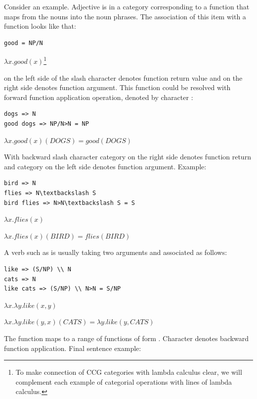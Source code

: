 Consider an example. Adjective  is in a category corresponding to a function that maps from the nouns into the noun phrases. The association of this item with a function looks like that:

\begin{verbatim}
good = NP/N 
\end{verbatim}

$\lambda x.good(x)$\footnote{To make connection of CCG categories with lambda calculus clear, we will complement each example of categorial operations with lines of lambda calculus.}

 on the left side of the slash character denotes function return value and  on the right side denotes function argument. This function could be resolved with forward function application operation, denoted by character \code{>}:

\begin{verbatim}
dogs => N
good dogs => NP/N>N = NP
\end{verbatim}

$\lambda x.good(x)(DOGS)=good(DOGS)$

With backward slash character \code{\textbackslash} category on the right side denotes function return and category on the left side denotes function argument. Example:

\begin{verbatim}
bird => N
flies => N\textbackslash S
bird flies => N>N\textbackslash S = S
\end{verbatim}

$\lambda x.flies(x)$

$\lambda x.flies(x)(BIRD)=flies(BIRD) $

A verb such as  is usually taking two arguments and associated as follows:

\begin{verbatim}
like => (S/NP) \\ N
cats => N
like cats => (S/NP) \\ N>N = S/NP
\end{verbatim}

$\lambda x.\lambda y.like(x, y)$

$\lambda x.\lambda y.like(y, x)(CATS)=\lambda y.like(y, CATS)$

The function  maps  to a range of functions of form .  Character \code{<} denotes backward function application. Final sentence example:

